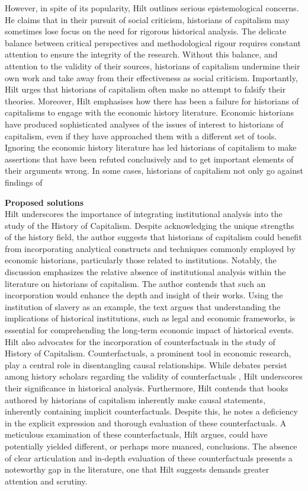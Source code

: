 \documentclass[10pt]{article}
\newcommand{\bb}{\bigbreak\noindent}
\begin{document}
\begin{spacing}{1.5}
		\bb
		However, in spite of its popularity, Hilt outlines serious epistemological concerns. He claims that in their pursuit of social criticism, historians of capitalism may sometimes lose focus on the need for rigorous historical analysis. The delicate balance between critical perspectives and methodological rigour requires constant attention to ensure the integrity of the research. Without this balance, and attention to the validity of their sources, historians of capitalism undermine their own work and take away from their effectiveness as social criticism. Importantly, Hilt urges that historians of capitalism often make no attempt to falsify their theories.  
		\bb
		Moreover, Hilt emphasises how there has been a failure for historians of capitalisms to engage with the economic history literature. Economic historians have produced sophisticated analyses of the issues of interest to historians of capitalism, even if they have approached them with a different set of tools. Ignoring the economic history literature has led historians of capitalism to make assertions that have been refuted conclusively and to get important elements of their arguments wrong. In some cases, historians of capitalism not only go against findings of
		
		\bb
		\textbf{Proposed solutions}\\
		Hilt underscores the importance of integrating institutional analysis into the study of the History of Capitalism. Despite acknowledging the unique strengths of the history field, the author suggests that historians of capitalism could benefit from incorporating analytical constructs and techniques commonly employed by economic historians, particularly those related to institutions. Notably, the discussion emphasizes the relative absence of institutional analysis within the literature on historians of capitalism. The author contends that such an incorporation would enhance the depth and insight of their works. Using the institution of slavery as an example, the text argues that understanding the implications of historical institutions, such as legal and economic frameworks, is essential for comprehending the long-term economic impact of historical events.
		\bb
		Hilt also advocates for the incorporation of counterfactuals in the study of History of Capitalism. Counterfactuals, a prominent tool in economic research, play a central role in disentangling causal relationships. While debates persist among history scholars regarding the validity of counterfactuals \parencite{evans2014altered}, Hilt underscores their significance in historical analysis. Furthermore, Hilt contends that books authored by historians of capitalism inherently make causal statements, inherently containing implicit counterfactuals. Despite this, he notes a deficiency in the explicit expression and thorough evaluation of these counterfactuals. A meticulous examination of these counterfactuals, Hilt argues, could have potentially yielded different, or perhaps more nuanced, conclusions. The absence of clear articulation and in-depth evaluation of these counterfactuals presents a noteworthy gap in the literature, one that Hilt suggests demands greater attention and scrutiny.
		

\end{spacing}
\end{document}
